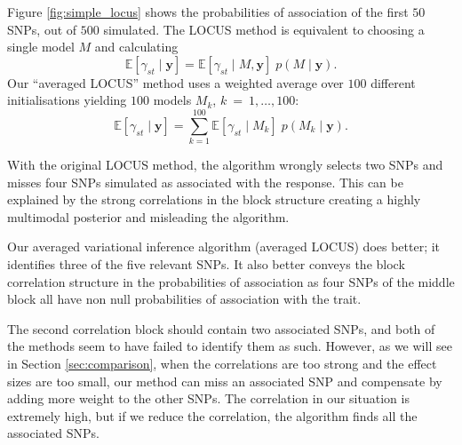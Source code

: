 \documentclass[a4paper, 11pt]{report}
\numberwithin{equation}{chapter}
\begin{document}
Figure \ref{fig:simple_locus} shows the probabilities of association of the first $50$ SNPs, out of $500$ simulated. The LOCUS method is equivalent to choosing a single model $M$ and calculating
\begin{equation*}
\mathbb{E}\left[\gamma_{st}\mid\boldsymbol{y}\right] = \mathbb{E}\left[\gamma_{st}\mid M,\boldsymbol{y}\right]\;p\left(M\mid\boldsymbol{y}\right).
\end{equation*}
Our ``averaged LOCUS'' method uses a weighted average over $100$ different initialisations yielding $100$ models $ M_k$, $k~=~1,\ldots,100$:
\begin{equation*}
\mathbb{E}\left[\gamma_{st}\mid\boldsymbol{y}\right] = \sum_{k=1}^{100}\mathbb{E}\left[\gamma_{st}\mid M_k\right]\;p\left(M_k\mid\boldsymbol{y}\right).
\end{equation*}

With the original LOCUS method, the algorithm wrongly selects two SNPs and misses four SNPs simulated as associated with the response. This can be explained by the strong correlations in the block structure creating a highly multimodal posterior and misleading the algorithm.

Our averaged variational inference algorithm (averaged LOCUS) does better; it identifies three of the five relevant SNPs. It also better conveys the block correlation structure in the probabilities of association as four SNPs of the middle block all have non null probabilities of association with the trait. 

The second correlation block should contain two associated SNPs, and both of the methods seem to have failed to identify them as such.
%
%
However, as we will see in Section \ref{sec:comparison}, when the correlations are too strong and the effect sizes are too small, our method can miss an associated SNP and compensate by adding more weight to the other SNPs. The correlation in our situation is extremely high, but if we reduce the correlation, the algorithm finds all the associated SNPs.
\end{document}
